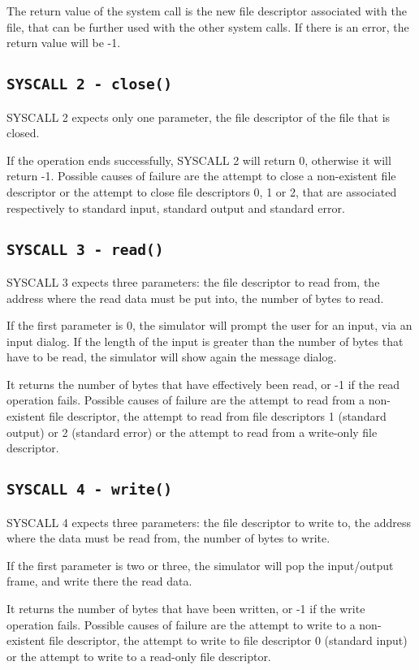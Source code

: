 \documentclass[12pt]{report}
\begin{document}
The return value of the system call is the new file descriptor associated with
the file, that can be further used with the other system calls. If there is an
error, the return value will be -1.

\subsection{\texttt{SYSCALL 2 - close()}}
SYSCALL 2 expects only one parameter, the file descriptor of the file that is
closed.

If the operation ends successfully, SYSCALL 2 will return 0, otherwise it will
return -1. Possible causes of failure are the attempt to close a non-existent
file descriptor or the attempt to close file descriptors 0, 1 or 2, that are
associated respectively to standard input, standard output and standard error.

\subsection{\texttt{SYSCALL 3 - read()}}
SYSCALL 3 expects three parameters: the file descriptor to read from, the
address where the read data must be put into, the number of bytes to read.

If the first parameter is 0, the simulator will prompt the user for an input,
via an input dialog. If the length of the input is greater than the number of
bytes that have to be read, the simulator will show again the message dialog.

It returns the number of bytes that have effectively been read, or -1 if the
read operation fails. Possible causes of failure are the attempt to read from a
non-existent file descriptor, the attempt to read from file descriptors 1
(standard output) or 2 (standard error) or the attempt to read from a write-only
file descriptor.

\subsection{\texttt{SYSCALL 4 - write()}}
SYSCALL 4 expects three parameters: the file descriptor to write to, the address
where the data must be read from, the number of bytes to write.

If the first parameter is two or three, the simulator will pop the input/output
frame, and write there the read data.

It returns the number of bytes that have been written, or -1 if the write
operation fails. Possible causes of failure are the attempt to write to a
non-existent file descriptor, the attempt to write to file descriptor 0
(standard input) or the attempt to write to a read-only file descriptor.
\end{document}
